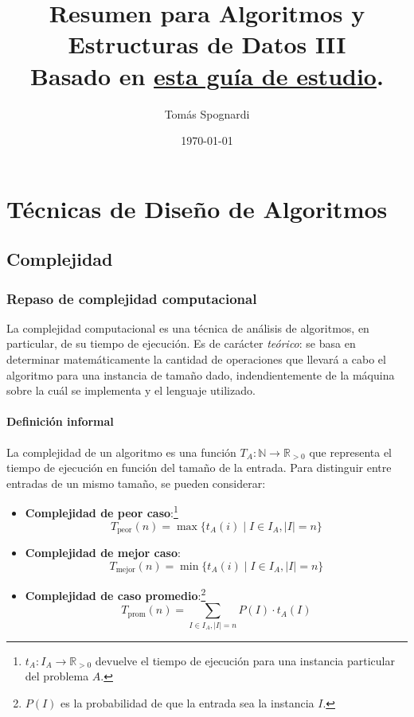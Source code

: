 \documentclass[a4paper]{report}
\title{%
    Resumen para Algoritmos y Estructuras de Datos III\\
    \small Basado en \href{https://campus.exactas.uba.ar/pluginfile.php/390238/mod_resource/content/1/resumen.pdf}{esta guía de estudio}.%
}
\author{Tomás Spognardi}
\date{\today}
\newcommand{\N}{\mathbb{N}}
\newcommand{\R}{\mathbb{R}}
\begin{document}
\maketitle



\tableofcontents

\chapter{Técnicas de Diseño de Algoritmos}

\section{Complejidad}

\subsection{Repaso de complejidad computacional}

La complejidad computacional es una técnica de análisis de algoritmos, en particular, de su tiempo de ejecución. Es de carácter \textit{teórico}: se basa en determinar matemáticamente la cantidad de operaciones que llevará a cabo el algoritmo para una instancia de tamaño dado, indendientemente de la máquina sobre la cuál se implementa y el lenguaje utilizado.

\subsubsection{Definición informal}

La complejidad de un algoritmo es una función $T_A: \N \longrightarrow \R_{>0}$ que representa el tiempo de ejecución en función del tamaño de la entrada. Para distinguir entre entradas de un mismo tamaño, se pueden considerar:
\begin{itemize}
    \item \textbf{Complejidad de peor caso}:\footnote{$t_A: I_A \longrightarrow \R_{>0}$ devuelve el tiempo de ejecución para una instancia particular del problema $A$.}
          $$T_{\text{peor}}(n) = \max{\{t_A(i)} \mid I \in I_A, |I| = n\}$$
    \item \textbf{Complejidad de mejor caso}:
          $$T_{\text{mejor}}(n) = \min{\{t_A(i)} \mid I \in I_A, |I| = n\}$$
    \item \textbf{Complejidad de caso promedio}:\footnote{$P(I)$ es la probabilidad de que la entrada sea la instancia $I$.}
          $$T_{\text{prom}}(n) = \sum_{I \in I_A, |I| = n} P(I) \cdot t_A(I) $$
\end{itemize}
\end{document}
